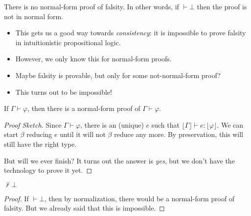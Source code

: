 \documentclass{lecturenotes}
\newcommand{\totype}[1]{\ensuremath{\lfloor #1 \rfloor}}
\begin{document}
\begin{cor}
  There is no normal-form proof of falsity.
  In other words, if $\vdash \bot$ then the proof is not in normal form.
\end{cor}

\begin{itemize}
\item This gets us a good way towards \emph{consistency}: it is impossible to prove falsity in intuitionistic propositional logic.
\item However, we only know this for normal-form proofs.
\item Maybe falsity is provable, but only for some not-normal-form proof?
\item This turns out to be impossible!
\end{itemize}

\begin{thm}[Normalization]
  If $\Gamma \vdash \varphi$, then there is a normal-form proof of $\Gamma \vdash \varphi$.
\end{thm}
\begin{proof}[Proof Sketch]
  Since $\Gamma \vdash \varphi$, there is an (unique) $e$ such that $\totype{\Gamma} \vdash e : \totype{\varphi}$.
  We can start $\beta$ reducing $e$ until it will not $\beta$ reduce any more.
  By preservation, this will still have the right type.
  
  But will we ever finish?
  It turns out the answer is \emph{yes}, but we don't have the technology to prove it yet.
\end{proof}

\begin{thm}[Consistency]
  $\not\vdash \bot$
\end{thm}
\begin{proof}
  If $\vdash \bot$, then by normalization, there would be a normal-form proof of falsity.
  But we already said that this is impossible.
\end{proof}
\end{document}
